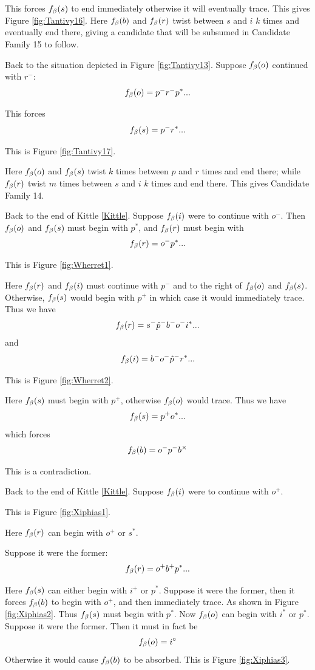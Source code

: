 This forces $f_\beta(s)$ to end immediately otherwise it will eventually trace. This gives Figure \ref{fig:Tantivy16}. Here $f_\beta(b)$ and $f_\beta(r)$ twist between $s$ and $i$ $k$ times and eventually end there, giving a candidate that will be subsumed in Candidate Family 15 to follow.

Back to the situation depicted in Figure \ref{fig:Tantivy13}. Suppose $f_\beta(o)$ continued with $r^-$:
$$f_\beta(o) = p^- r^-p^*...$$

This forces
$$f_\beta(s) = p^- r^*...$$

This is Figure \ref{fig:Tantivy17}. 

Here $f_\beta(o)$ and $f_\beta(s)$ twist $k$ times between $p$ and $r$ times and end there; while $f_\beta(r)$ twist $m$ times between $s$ and $i$ $k$ times and end there. This gives Candidate Family 14.


Back to the end of Kittle \ref{Kittle}. Suppose $f_\beta(i)$ were to continue with $o^-$. Then $f_\beta(o)$ and $f_\beta(s)$ must begin with $p^*$, and $f_\beta(r)$ must begin with
$$f_\beta(r) = o^- p^*...$$

This is Figure \ref{fig:Wherret1}.

Here $f_\beta(r)$ and $f_\beta(i)$ must continue with $p^-$ and to the right of $f_\beta(o)$ and $f_\beta(s)$. Otherwise, $f_\beta(s)$ would begin with $p^+$ in which case it would immediately trace. Thus we have
$$f_\beta(r) = s^- \hat{p}^- b^- o^- i^*...$$
and 
$$f_\beta(i) = b^- o^- \hat{p}^- r^*...$$

This is Figure \ref{fig:Wherret2}.

Here $f_\beta(s)$ must begin with $p^+$, otherwise $f_\beta(o)$ would trace. Thus we have
$$f_\beta(s) = p^+ o^*...$$
which forces
$$f_\beta(b) = o^- p^- b^\times$$

This is a contradiction.

\label{Xiphias}
Back to the end of Kittle \ref{Kittle}. Suppose $f_\beta(i)$ were to continue with $o^+$.

This is Figure \ref{fig:Xiphias1}.

Here $f_\beta(r)$ can begin with $o^+$ or $s^*$.

Suppose it were the former:
$$f_\beta(r) = o^+b^+ p^*...$$

Here $f_\beta(s)$ can either begin with $i^+$ or $p^*$. Suppose it were the former, then it forces $f_\beta(b)$ to begin with $o^+$, and then immediately trace. As shown in Figure \ref{fig:Xiphias2}. Thus $f_\beta(s)$ must begin with $p^*$. Now $f_\beta(o)$ can begin with $i^*$ or $p^*$. Suppose it were the former. Then it must in fact be 
$$f_\beta(o) = i^\circ$$
Otherwise it would cause $f_\beta(b)$ to be absorbed. This is Figure \ref{fig:Xiphias3}.

